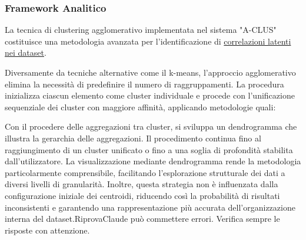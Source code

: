 \subsubsection{Framework Analitico}

La tecnica di clustering agglomerativo implementata nel sistema "A-CLUS" costituisce una metodologia avanzata per l'identificazione di \underline{correlazioni latenti nei dataset}. 

Diversamente da tecniche alternative come il k-means, l'approccio agglomerativo elimina la necessità di predefinire il numero di raggruppamenti. La procedura inizializza ciascun elemento come cluster individuale e procede con l'unificazione sequenziale dei cluster con maggiore affinità, applicando metodologie quali:  



Con il procedere delle aggregazioni tra cluster, si sviluppa un dendrogramma che illustra la gerarchia delle aggregazioni. Il procedimento continua fino al raggiungimento di un cluster unificato o fino a una soglia di profondità stabilita dall'utilizzatore. La visualizzazione mediante dendrogramma rende la metodologia particolarmente comprensibile, facilitando l'esplorazione strutturale dei dati a diversi livelli di granularità. Inoltre, questa strategia non è influenzata dalla configurazione iniziale dei centroidi, riducendo così la probabilità di risultati inconsistenti e garantendo una rappresentazione più accurata dell'organizzazione interna del dataset.RiprovaClaude può commettere errori. Verifica sempre le risposte con attenzione.


